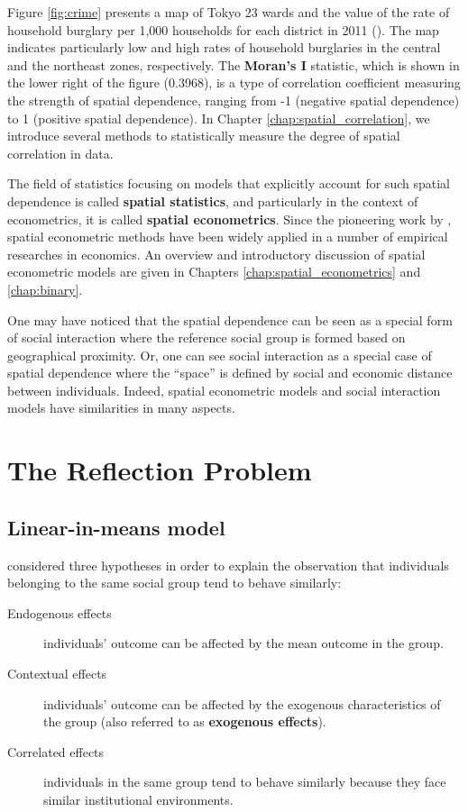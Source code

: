 \documentclass[10.5pt, A4paper, openany, uplatex]{book}
\numberwithin{equation}{section}
\begin{document}
Figure \ref{fig:crime} presents a map of Tokyo 23 wards and the value of the rate of household burglary per 1,000 households for each district in 2011 (\cite{hoshino2018semiparametric}).
The map indicates particularly low and high rates of household burglaries in the central and the northeast zones, respectively.
The \textbf{Moran's I} statistic, which is shown in the lower right of the figure (0.3968), is a type of correlation coefficient measuring the strength of spatial dependence, ranging from -1 (negative spatial dependence) to 1 (positive spatial dependence).
In Chapter \ref{chap:spatial_correlation}, we introduce several methods to statistically measure the degree of spatial correlation in data.

The field of statistics focusing on models that explicitly account for such spatial dependence is called \textbf{spatial statistics}, and particularly in the context of econometrics, it is called \textbf{spatial econometrics}.
Since the pioneering work by \cite{anselin1988spatial}, spatial econometric methods have been widely applied in a number of empirical researches in economics.
An overview and introductory discussion of spatial econometric models are given in Chapters \ref{chap:spatial_econometrics} and \ref{chap:binary}.

One may have noticed that the spatial dependence can be seen as a special form of social interaction where the reference social group is formed based on geographical proximity.
Or, one can see social interaction as a special case of spatial dependence where the ``space'' is defined by social and economic distance between individuals.
Indeed, spatial econometric models and social interaction models have similarities in many aspects.


\chapter{The Reflection Problem}\label{chap:reflection}
\section{Linear-in-means model}
\cite{manski1993identification} considered three hypotheses in order to explain the observation that individuals belonging to the same social group tend to behave similarly:
\begin{description}
	\item[Endogenous effects]  individuals' outcome can be affected by the mean outcome in the group.
	\item[Contextual effects] individuals' outcome can be affected by the exogenous characteristics of the group (also referred to as \textbf{exogenous effects}).
	\item[Correlated effects] individuals in the same group tend to behave similarly because they face similar institutional environments.
\end{description}
\end{document}
